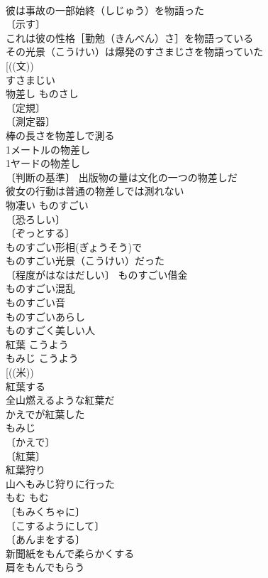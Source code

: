 \documentclass[8pt]{extreport}
\begin{document}
\begin{CJK}{UTF8}{min}
\\	彼は事故の一部始終（しじゅう）を物語った 
\\	〔示す〕
\\	これは彼の性格［勤勉（きんべん）さ］を物語っている 
\\	その光景（こうけい）は爆発のすさまじさを物語っていた 
\\	[((文))
\\	すさまじい　
\\	物差し	ものさし	
\\	〔定規〕
\\	〔測定器〕
\\	棒の長さを物差しで測る 
\\	1メートルの物差し 
\\	1ヤードの物差し 
\\	〔判断の基準〕 出版物の量は文化の一つの物差しだ 
\\	彼女の行動は普通の物差しでは測れない 
\\	物凄い	ものすごい	
\\	〔恐ろしい〕
\\	〔ぞっとする〕
\\	ものすごい形相(ぎょうそう)で 
\\	ものすごい光景（こうけい）だった 
\\	〔程度がはなはだしい〕 ものすごい借金 
\\	ものすごい混乱 
\\	ものすごい音 
\\	ものすごいあらし 
\\	ものすごく美しい人 
\\	紅葉	こうよう 
\\	もみじ	こうよう 
\\	[((米)) 
\\	紅葉する 
\\	全山燃えるような紅葉だ 
\\	かえでが紅葉した 
\\	もみじ 
\\	〔かえで〕
\\	〔紅葉〕
\\	紅葉狩り 
\\	山へもみじ狩りに行った 
\\	もむ	もむ	
\\	〔もみくちゃに〕
\\	〔こするようにして〕
\\	〔あんまをする〕
\\	新聞紙をもんで柔らかくする 
\\	肩をもんでもらう 

\end{CJK}
\end{document}
